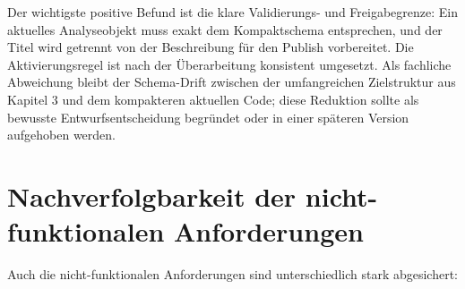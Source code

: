 Der wichtigste positive Befund ist die klare Validierungs- und Freigabegrenze: Ein aktuelles Analyseobjekt muss exakt dem Kompaktschema entsprechen, und der Titel wird getrennt von der Beschreibung für den Publish vorbereitet. Die Aktivierungsregel ist nach der Überarbeitung konsistent umgesetzt. Als fachliche Abweichung bleibt der Schema-Drift zwischen der umfangreichen Zielstruktur aus Kapitel 3 und dem kompakteren aktuellen Code; diese Reduktion sollte als bewusste Entwurfsentscheidung begründet oder in einer späteren Version aufgehoben werden.

\clearpage
\section{Nachverfolgbarkeit der nicht-funktionalen Anforderungen}

Auch die nicht-funktionalen Anforderungen sind unterschiedlich stark abgesichert:

